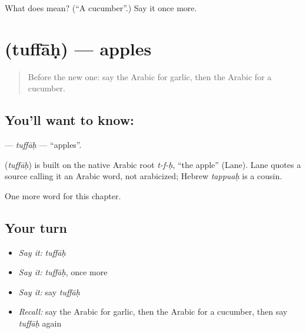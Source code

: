 \begin{tcolorbox}[breakable,colback=teal!4,colframe=teal!35!black,title={Before you move on}]
What does  mean? (\textquotedblleft{}A cucumber\textquotedblright{}.) Say it once more.
\end{tcolorbox}
\section[\texorpdfstring{\ar{تفاح} (tuffāḥ)}{تفاح (tuffāḥ)}]{ (tuffāḥ) — apples}

\label{lesson:AR-C129-tuffah}



\begin{quote}
Before the new one: say the Arabic for garlic, then the Arabic for a cucumber.
\end{quote}

\subsection*{You'll want to know: }
\textbf{} — \emph{tuffāḥ} — \textquotedblleft{}apples\textquotedblright{}.

\begin{cousinweb}
\textbf{} (\emph{tuffāḥ}) is built on the native Arabic root \emph{t-f-ḥ}, \textquotedblleft{}the apple\textquotedblright{} (Lane). Lane quotes a source calling it an Arabic word, not arabicized; Hebrew \emph{tappuaḥ} is a cousin.
\end{cousinweb}

\begin{grammarlens}[title={What you've built}]
One more word for this chapter.
\end{grammarlens}

\subsection*{Your turn}
\begin{itemize}
\raggedright
  \item \emph{Say it:} \emph{tuffāḥ}
  \item \emph{Say it:} \emph{tuffāḥ}, once more
  \item \emph{Say it:} say \emph{tuffāḥ}
  \item \emph{Recall:} say the Arabic for garlic, then the Arabic for a cucumber, then say \emph{tuffāḥ} again
\end{itemize}

